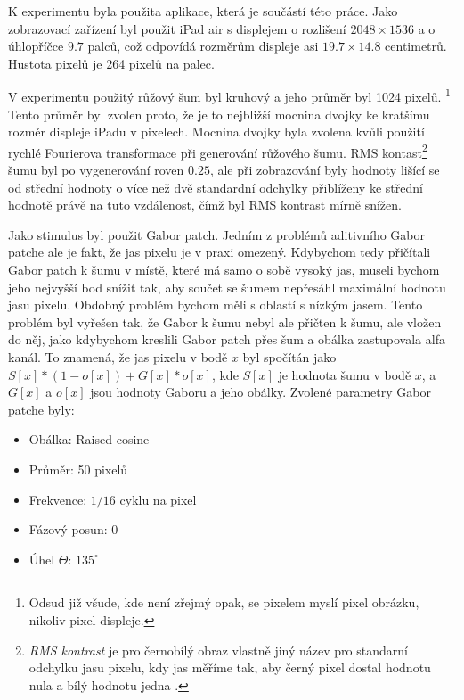 K experimentu byla použita aplikace, která je součástí této práce. 
Jako zobrazovací zařízení byl použit iPad air s displejem o rozlišení
$2048\times1536$ a o úhlopříčce $9.7$ palců, což odpovídá rozměrům displeje asi
$19.7 \times 14.8$ centimetrů. Hustota pixelů je 264 pixelů na palec. 

V experimentu použitý růžový šum byl kruhový a jeho průměr byl 1024 pixelů.
\footnote{Odsud již všude, kde není zřejmý opak, se pixelem myslí
pixel obrázku, nikoliv pixel displeje.} Tento průměr byl zvolen proto, že je
to nejbližší mocnina dvojky ke kratšímu rozměr displeje iPadu v pixelech.
Mocnina dvojky byla zvolena kvůli použití rychlé Fourierova transformace při
generování růžového šumu. RMS kontast\footnote{{\it RMS kontrast} je pro
černobílý obraz vlastně jiný název pro standarní odchylku jasu pixelu, kdy jas
měříme tak, aby černý pixel dostal hodnotu nula a bílý hodnotu jedna
\citep{RMS}.} šumu byl po vygenerování roven $0.25$, ale při zobrazování byly
hodnoty lišící se od střední hodnoty o více než dvě standardní odchylky
přiblíženy ke střední hodnotě právě na tuto vzdálenost, čímž byl RMS kontrast
mírně snížen. 

Jako stimulus byl použit Gabor patch. Jedním z problémů aditivního Gabor patche
ale je fakt, že jas pixelu je v praxi omezený. Kdybychom tedy přičítali Gabor
patch k šumu v místě, které má samo o sobě vysoký jas, museli bychom jeho nejvyšší
bod snížit tak, aby součet se šumem nepřesáhl maximální hodnotu jasu pixelu.
Obdobný problém bychom měli s oblastí s nízkým jasem. Tento problém byl vyřešen
tak, že Gabor k šumu nebyl ale přičten k šumu, ale vložen do něj, jako
kdybychom kreslili Gabor patch přes šum a obálka zastupovala alfa kanál. To
znamená, že jas pixelu v bodě $x$ byl spočítán jako $S[x] * (1-o[x]) +
G[x]*o[x]$, kde $S[x]$ je hodnota šumu v bodě $x$, a $G[x]$ a $o[x]$ jsou
hodnoty Gaboru a jeho obálky.  Zvolené parametry Gabor patche byly:

\begin{itemize}
\item Obálka: Raised cosine
\item Průměr: 50 pixelů
\item Frekvence: $1/16$ cyklu na pixel
\item Fázový posun: 0
\item Úhel $\Theta$: $135^\circ$ 
\end{itemize}

